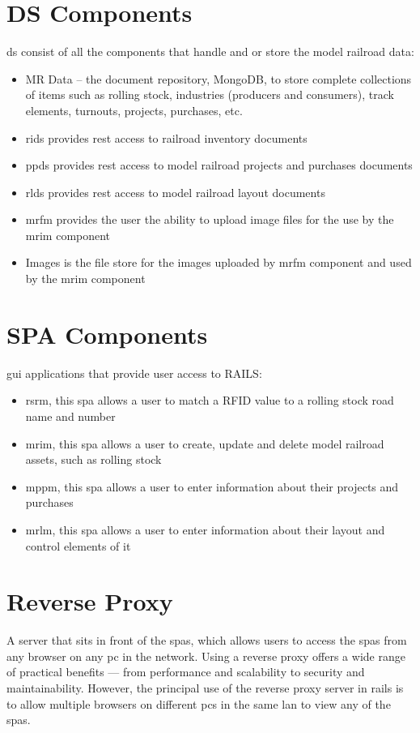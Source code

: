 \section{DS Components}
\gls{ds} consist of all the components that handle and or store the model railroad data:
\begin{itemize}
  \item MR Data – the document repository, MongoDB, to store complete collections of items such as rolling stock, industries (producers and consumers), track elements, turnouts, projects, purchases, etc.
  \item \gls{rids} provides \gls{rest} access to railroad inventory documents
  \item \gls{ppds} provides \gls{rest} access to model railroad projects and purchases documents
  \item \gls{rlds} provides \gls{rest} access to model railroad layout documents
  \item \gls{mrfm} provides the user the ability to upload image files for the use by the \gls{mrim} component
  \item Images is the file store for the images uploaded by \gls{mrfm} component and used by the \gls{mrim} component
\end{itemize}
\section{SPA Components}
\gls{gui} applications that provide user access to RAILS:
\begin{itemize}
  \item \gls{rsrm}, this \gls{spa} allows a user to match a RFID value to a rolling stock road name and number
  \item \gls{mrim}, this \gls{spa} allows a user to create, update and delete model railroad assets, such as rolling stock
  \item \gls{mppm}, this \gls{spa} allows a user to enter information about their projects and purchases
  \item \gls{mrlm}, this \gls{spa} allows a user to enter information about their layout and control elements of it
\end{itemize}
\section{Reverse Proxy}
A server that sits in front of the \gls{spas}, which allows users to access the \gls{spas} from any browser on any \gls{pc} in the network. Using a reverse proxy offers a wide range of practical benefits — from performance and scalability to security and maintainability. However, the principal use of the reverse proxy server in \gls{rails} is to allow multiple browsers on different \gls{pcs} in the same \gls{lan} to view any of the \gls{spas}.

